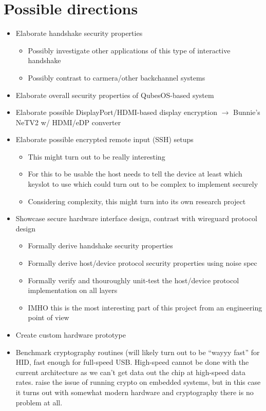 \documentclass[12pt,a4paper,notitlepage]{article}
\begin{document}
\section{Possible directions}
\begin{itemize}
    \item Elaborate handshake security properties
        \begin{itemize}
            \item Possibly investigate other applications of this type of interactive handshake
            \item Possibly contrast to carmera/other backchannel systems
        \end{itemize}
    \item Elaborate overall security properties of QubesOS-based system
    \item Elaborate possible DisplayPort/HDMI-based display encryption $\rightarrow$ Bunnie's NeTV2 w/ HDMI/eDP converter
    \item Elaborate possible encrypted remote input (SSH) setups
        \begin{itemize}
            \item This might turn out to be really interesting
            \item For this to be usable the host needs to tell the device at least which keyslot to use which could turn
                out to be complex to implement securely
            \item Considering complexity, this might turn into its own research project
        \end{itemize}
    \item Showcase secure hardware interface design, contrast with wireguard protocol design
        \begin{itemize}
            \item Formally derive handshake security properties
            \item Formally derive host/device protocol security properties using noise spec
            \item Formally verify and thouroughly unit-test the host/device protocol implementation on all layers
            \item IMHO this is the most interesting part of this project from an engineering point of view
        \end{itemize}
    \item Create custom hardware prototype
    \item Benchmark cryptography routines (will likely turn out to be ``wayyy fast'' for HID, fast enough for full-speed
        USB. High-speed cannot be done with the current architecture as we can't get data out the chip at high-speed
        data rates. \textcite{srivaths01} raise the issue of running crypto on embedded systems, but in this case it
        turns out with somewhat modern hardware and cryptography there is no problem at all.
\end{itemize}
\end{document}
